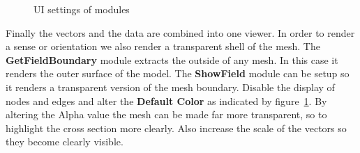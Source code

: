 \documentclass[fleqn,11pt,openany]{book}
\begin{document}
\begin{figure}
\caption{UI settings of modules}\label{fig:SimulationNetwork5}
\end{figure}

Finally the vectors and the data are combined into one viewer. In order to render a sense or orientation we also render a transparent shell of the mesh. The {\bf GetFieldBoundary} module extracts the outside of any mesh. In this case it renders the outer surface of the model. The {\bf ShowField} module can be setup so it renders a transparent version of the mesh boundary. Disable the display of nodes and edges and alter the {\bf Default Color} as indicated by figure~\ref{fig:SimulationNetwork5}. By  altering the Alpha value the mesh can be made far more transparent, so to highlight the cross section more clearly. Also increase the scale of the vectors so they become clearly visible.
\end{document}
